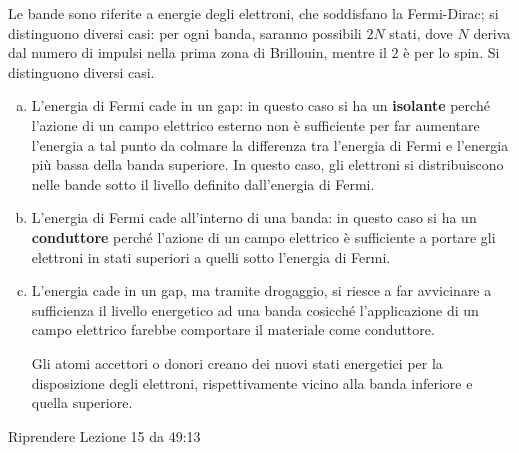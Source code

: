 \documentclass[10pt, a4paper]{scrartcl}
\numberwithin{equation}{subsection}
\theoremstyle{style1}
\newenvironment{boxenv}[1][]{
    \begin{eqbox}[#1]
    }{
   \end{eqbox}
}
\begin{document}
Le bande sono riferite a energie degli elettroni, che soddisfano la Fermi-Dirac; si distinguono diversi casi: per ogni banda, saranno possibili $2N$ stati, dove $N$ deriva dal numero di impulsi nella prima zona di Brillouin, mentre il $2$ \`e per lo spin. 
Si distinguono diversi casi.
\begin{enumerate}[(a).]
	\item L'energia di Fermi cade in un gap: in questo caso si ha un \textbf{isolante} perch\'e l'azione di un campo elettrico esterno non \`e sufficiente per far aumentare l'energia a tal punto da colmare la differenza tra l'energia di Fermi e l'energia pi\`u bassa della banda superiore. In questo caso, gli elettroni si distribuiscono nelle bande sotto il livello definito dall'energia di Fermi.
	\item L'energia di Fermi cade all'interno di una banda: in questo caso si ha un \textbf{conduttore} perch\'e l'azione di un campo elettrico \`e sufficiente a portare gli elettroni in stati superiori a quelli sotto l'energia di Fermi.
	\item L'energia cade in un gap, ma tramite drogaggio, si riesce a far avvicinare a sufficienza il livello energetico ad una banda cosicch\'e l'applicazione di un campo elettrico farebbe comportare il materiale come conduttore. 

		Gli atomi accettori o donori creano dei nuovi stati energetici per la disposizione degli elettroni, rispettivamente vicino alla banda inferiore e quella superiore.
\end{enumerate}
\begin{boxenv}[]
\centering Riprendere Lezione 15 da 49:13 
\end{boxenv}
\end{document}
